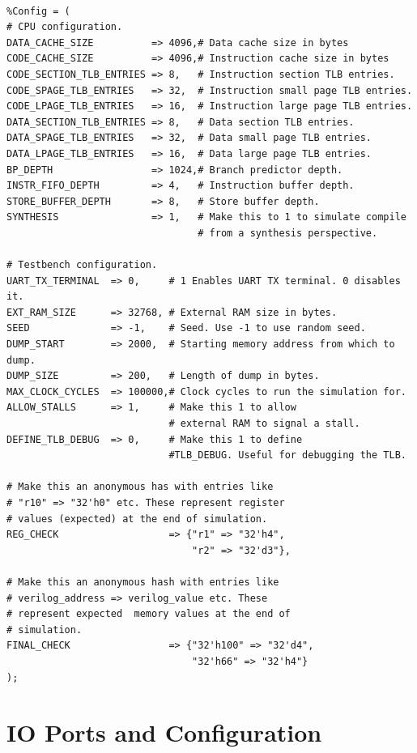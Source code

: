 \documentclass[10pt]{article}
\begin{document}
\begin{lstlisting}[frame=none] % Perl code block start.

%Config = ( 
# CPU configuration.
DATA_CACHE_SIZE          => 4096,# Data cache size in bytes
CODE_CACHE_SIZE          => 4096,# Instruction cache size in bytes
CODE_SECTION_TLB_ENTRIES => 8,   # Instruction section TLB entries.
CODE_SPAGE_TLB_ENTRIES   => 32,  # Instruction small page TLB entries.
CODE_LPAGE_TLB_ENTRIES   => 16,  # Instruction large page TLB entries.
DATA_SECTION_TLB_ENTRIES => 8,   # Data section TLB entries.
DATA_SPAGE_TLB_ENTRIES   => 32,  # Data small page TLB entries.
DATA_LPAGE_TLB_ENTRIES   => 16,  # Data large page TLB entries.
BP_DEPTH                 => 1024,# Branch predictor depth.
INSTR_FIFO_DEPTH         => 4,   # Instruction buffer depth.
STORE_BUFFER_DEPTH       => 8,   # Store buffer depth.
SYNTHESIS                => 1,   # Make this to 1 to simulate compile 
                                 # from a synthesis perspective.

# Testbench configuration.
UART_TX_TERMINAL  => 0,     # 1 Enables UART TX terminal. 0 disables it.
EXT_RAM_SIZE      => 32768, # External RAM size in bytes.
SEED              => -1,    # Seed. Use -1 to use random seed.
DUMP_START        => 2000,  # Starting memory address from which to dump.
DUMP_SIZE         => 200,   # Length of dump in bytes.
MAX_CLOCK_CYCLES  => 100000,# Clock cycles to run the simulation for.
ALLOW_STALLS      => 1,     # Make this 1 to allow 
                            # external RAM to signal a stall.
DEFINE_TLB_DEBUG  => 0,     # Make this 1 to define 
                            #TLB_DEBUG. Useful for debugging the TLB.

# Make this an anonymous has with entries like 
# "r10" => "32'h0" etc. These represent register 
# values (expected) at the end of simulation.
REG_CHECK                   => {"r1" => "32'h4", 
                                "r2" => "32'd3"},      

# Make this an anonymous hash with entries like 
# verilog_address => verilog_value etc. These 
# represent expected  memory values at the end of 
# simulation.
FINAL_CHECK                 => {"32'h100" => "32'd4", 
                                "32'h66" => "32'h4"}       
);

\end{lstlisting}

\section{IO Ports and Configuration}
\end{document}
